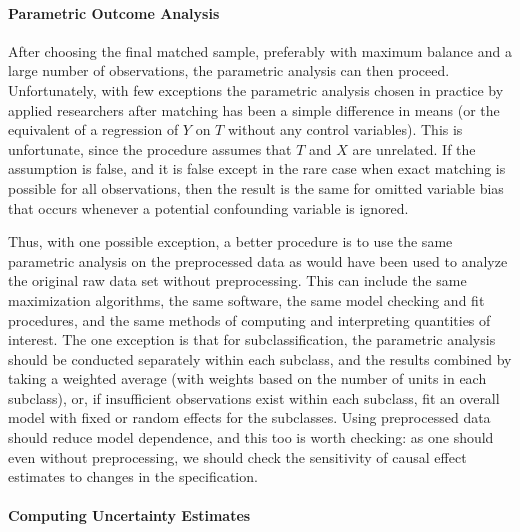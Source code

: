 \documentclass[11pt,titlepage]{article}
\begin{document}

\paragraph{Parametric Outcome Analysis}  
After choosing the final matched sample, preferably with maximum
balance and a large number of observations, the parametric analysis
can then proceed.  Unfortunately, with few exceptions the parametric
analysis chosen in practice by applied researchers after matching has
been a simple difference in means (or the equivalent of a regression
of $Y$ on $T$ without any control variables).  This is unfortunate,
since the procedure assumes that $T$ and $X$ are unrelated.  If the
assumption is false, and it is false except in the rare case when
exact matching is possible for all observations, then the result is
the same for omitted variable bias that occurs whenever a potential
confounding variable is ignored.

Thus, with one possible exception, a better procedure is to use the
same parametric analysis on the preprocessed data as would have been
used to analyze the original raw data set without preprocessing.  This
can include the same maximization algorithms, the same software, the
same model checking and fit procedures, and the same methods of
computing and interpreting quantities of interest.  The one exception
is that for subclassification, the parametric analysis should be
conducted separately within each subclass, and the results combined by
taking a weighted average (with weights based on the number of units
in each subclass), or, if insufficient observations exist within each
subclass, fit an overall model with fixed or random effects for the
subclasses.  Using preprocessed data should reduce model dependence,
and this too is worth checking: as one should even without
preprocessing, we should check the sensitivity of causal effect
estimates to changes in the specification.

\paragraph{Computing Uncertainty Estimates}
\end{document}

